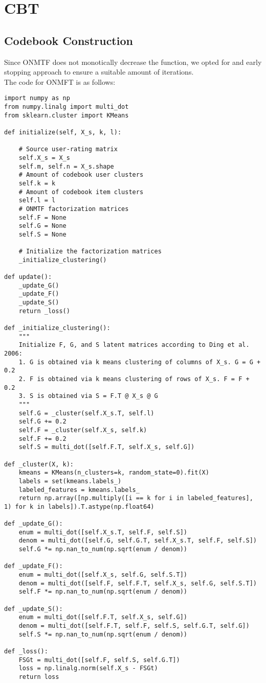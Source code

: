 \section{CBT}


\subsection{Codebook Construction}
\label{ss:cbt-codebook-construction}

Since ONMTF does not monotically decrease the function, we opted for and early stopping approach to ensure a suitable amount of iterations.\\
The code for ONMFT is as follows:
\begin{verbatim}
import numpy as np
from numpy.linalg import multi_dot
from sklearn.cluster import KMeans

def initialize(self, X_s, k, l):

    # Source user-rating matrix
    self.X_s = X_s
    self.m, self.n = X_s.shape
    # Amount of codebook user clusters
    self.k = k
    # Amount of codebook item clusters
    self.l = l
    # ONMTF factorization matrices
    self.F = None
    self.G = None
    self.S = None
    
    # Initialize the factorization matrices
    _initialize_clustering()

def update():
    _update_G()
    _update_F()
    _update_S()
    return _loss()

def _initialize_clustering():
    """
    Initialize F, G, and S latent matrices according to Ding et al. 2006:
    1. G is obtained via k means clustering of columns of X_s. G = G + 0.2
    2. F is obtained via k means clustering of rows of X_s. F = F + 0.2
    3. S is obtained via S = F.T @ X_s @ G
    """
    self.G = _cluster(self.X_s.T, self.l)
    self.G += 0.2
    self.F = _cluster(self.X_s, self.k)
    self.F += 0.2
    self.S = multi_dot([self.F.T, self.X_s, self.G])
    
def _cluster(X, k):
    kmeans = KMeans(n_clusters=k, random_state=0).fit(X)
    labels = set(kmeans.labels_)
    labeled_features = kmeans.labels_
    return np.array([np.multiply([i == k for i in labeled_features], 1) for k in labels]).T.astype(np.float64)

def _update_G():
    enum = multi_dot([self.X_s.T, self.F, self.S])
    denom = multi_dot([self.G, self.G.T, self.X_s.T, self.F, self.S])
    self.G *= np.nan_to_num(np.sqrt(enum / denom))

def _update_F():
    enum = multi_dot([self.X_s, self.G, self.S.T])
    denom = multi_dot([self.F, self.F.T, self.X_s, self.G, self.S.T])
    self.F *= np.nan_to_num(np.sqrt(enum / denom))

def _update_S():
    enum = multi_dot([self.F.T, self.X_s, self.G])
    denom = multi_dot([self.F.T, self.F, self.S, self.G.T, self.G])
    self.S *= np.nan_to_num(np.sqrt(enum / denom))

def _loss():
    FSGt = multi_dot([self.F, self.S, self.G.T])
    loss = np.linalg.norm(self.X_s - FSGt)
    return loss
\end{verbatim}
